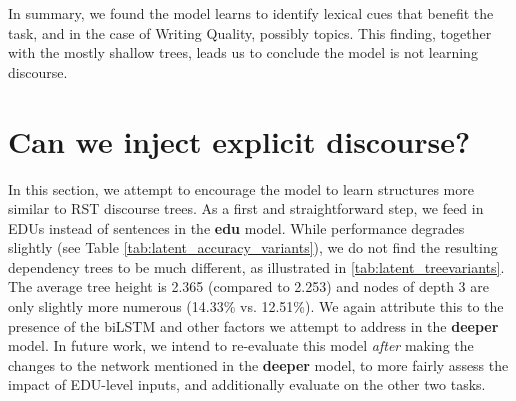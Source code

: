 In summary, we found the model learns to identify lexical cues that benefit the task, and in the case of Writing Quality, possibly topics. This finding, together with the mostly shallow trees, leads us to conclude the model is not learning discourse.
 
\section{Can we inject explicit discourse?}
In this section, we attempt to encourage the model to learn structures more similar to RST discourse trees. As a first and straightforward step, we feed in EDUs instead of sentences in the \textbf{edu} model. While performance degrades slightly (see Table \ref{tab:latent_accuracy_variants}), we do not find the resulting dependency trees to be much different, as illustrated in \ref{tab:latent_treevariants}. The average tree height is 2.365 (compared to 2.253) and nodes of depth 3 are only slightly more numerous (14.33\% vs. 12.51\%). We again attribute this to the presence of the biLSTM and other factors we attempt to address in the \textbf{deeper} model. In future work, we intend to re-evaluate this model \emph{after} making the changes to the network mentioned in the \textbf{deeper} model, to more fairly assess the impact of EDU-level inputs, and additionally evaluate on the other two tasks. 

